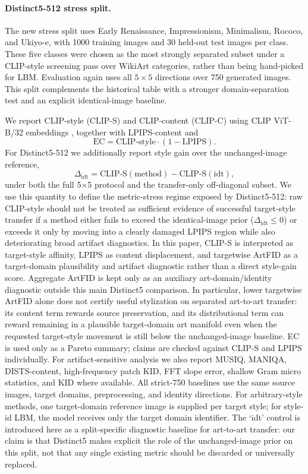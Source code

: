 \documentclass[letterpaper]{article}
\begin{document}
\paragraph{Distinct5-512 stress split.}
The new stress split uses Early Renaissance, Impressionism, Minimalism, Rococo, and Ukiyo-e, with 1000 training images and 30 held-out test images per class. These five classes were chosen as the most strongly separated subset under a CLIP-style screening pass over WikiArt categories, rather than being hand-picked for LBM. Evaluation again uses all $5\times5$ directions over 750 generated images. This split complements the historical table with a stronger domain-separation test and an explicit identical-image baseline.

We report CLIP-style (CLIP-S) and CLIP-content (CLIP-C) using CLIP ViT-B/32 embeddings \cite{radford2021clip}, together with LPIPS-content and
\begin{equation}
    \mathrm{EC} = \mathrm{CLIP\mbox{-}style}\cdot(1-\mathrm{LPIPS}).
\end{equation}
For Distinct5-512 we additionally report style gain over the unchanged-image reference,
\begin{equation}
    \Delta_{\mathrm{idt}} = \mathrm{CLIP\mbox{-}S}(\text{method}) - \mathrm{CLIP\mbox{-}S}(\text{idt}),
\end{equation}
under both the full 5$\times$5 protocol and the transfer-only off-diagonal subset. We use this quantity to define the metric-stress regime exposed by Distinct5-512: raw CLIP-style should not be treated as sufficient evidence of successful target-style transfer if a method either fails to exceed the identical-image prior ($\Delta_{\mathrm{idt}}\le 0$) or exceeds it only by moving into a clearly damaged LPIPS region while also deteriorating broad artifact diagnostics. In this paper, CLIP-S is interpreted as target-style affinity, LPIPS as content displacement, and targetwise ArtFID as a target-domain plausibility and artifact diagnostic rather than a direct style-gain score. Aggregate ArtFID is kept only as an auxiliary art-domain/identity diagnostic outside this main Distinct5 comparison. In particular, lower targetwise ArtFID alone does not certify useful stylization on separated art-to-art transfer: its content term rewards source preservation, and its distributional term can reward remaining in a plausible target-domain art manifold even when the requested target-style movement is still below the unchanged-image baseline. EC is used only as a Pareto summary; claims are checked against CLIP-S and LPIPS individually. For artifact-sensitive analysis we also report MUSIQ, MANIQA, DISTS-content, high-frequency patch KID, FFT slope error, shallow Gram micro statistics, and KID where available. All strict-750 baselines use the same source images, target domains, preprocessing, and identity directions. For arbitrary-style methods, one target-domain reference image is supplied per target style; for style-id LBM, the model receives only the target domain identifier. The `idt' control is introduced here as a split-specific diagnostic baseline for art-to-art transfer: our claim is that Distinct5 makes explicit the role of the unchanged-image prior on this split, not that any single existing metric should be discarded or universally replaced.
\end{document}
